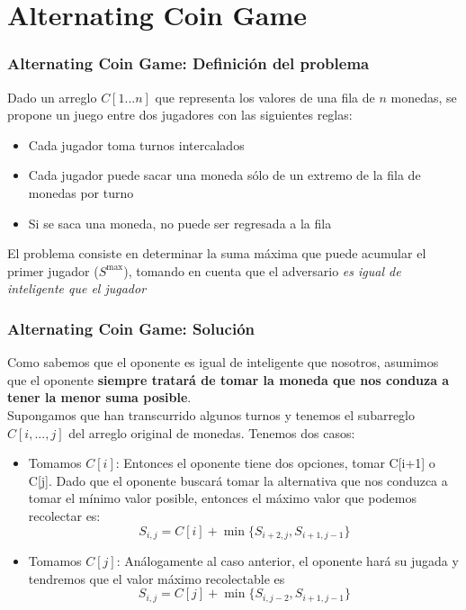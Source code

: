 \documentclass[10pt]{beamer}
\begin{document}
\section{Alternating Coin Game}
    \begin{frame}
        \frametitle{Alternating Coin Game: Definición del problema}
        Dado un arreglo $C[1...n]$ que representa los valores de una fila de $n$ monedas, se propone un juego entre dos jugadores con las siguientes reglas:
        \begin{itemize}
            \item Cada jugador toma turnos intercalados
            \item Cada jugador puede sacar una moneda sólo de un extremo de la fila de monedas por turno
            \item Si se saca una moneda, no puede ser regresada a la fila
        \end{itemize}
        El problema consiste en determinar la suma máxima que puede acumular el primer jugador ($S^{\max}$), tomando en cuenta que el adversario \textit{es igual de inteligente que el jugador}
    \end{frame}
    \begin{frame}
        \frametitle{Alternating Coin Game: Solución}
        Como sabemos que el oponente es igual de inteligente que nosotros, asumimos que el oponente \textbf{siempre tratará de tomar la moneda que nos conduza a tener la menor suma posible}.\\
        Supongamos que han transcurrido algunos turnos y tenemos el subarreglo $C[i,...,j]$ del arreglo original de monedas. Tenemos dos casos:
        \begin{itemize}
            \item Tomamos $C[i]$: Entonces el oponente tiene dos opciones, tomar C[i+1] o C[j]. Dado que el oponente buscará tomar la alternativa que nos conduzca a tomar el mínimo valor posible,
            entonces el máximo valor que podemos recolectar es:
            \begin{equation*}
                S_{i,j} = C[i] + \min\{S_{i+2,j},S_{i+1,j-1}\}
            \end{equation*}
            \item Tomamos $C[j]$: Análogamente al caso anterior, el oponente hará su jugada y tendremos que el valor máximo recolectable es
            \begin{equation*}
                S_{i,j} = C[j] + \min\{S_{i,j-2},S_{i+1,j-1}\}
            \end{equation*}
        \end{itemize}
    \end{frame}
\end{document}
